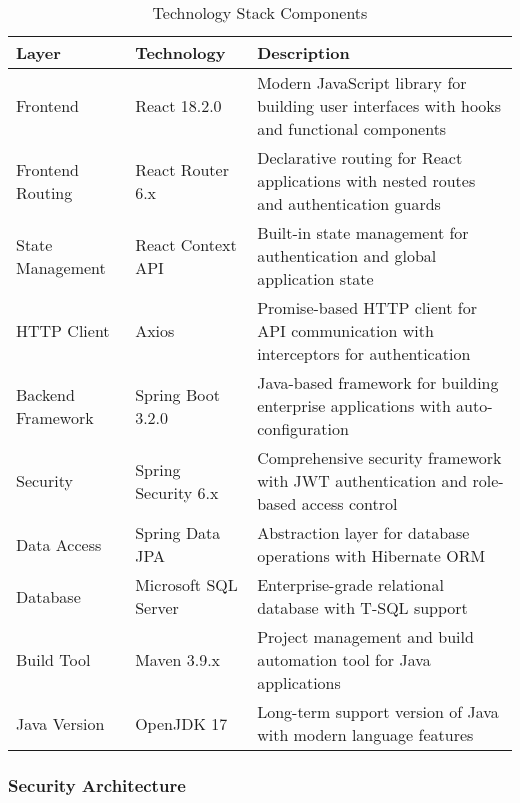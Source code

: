 \documentclass[12pt,a4paper]{article}
\begin{document}
\begin{table}[H]
\centering
\caption{Technology Stack Components}
\label{tab:tech-stack}
\begin{tabularx}{\textwidth}{|l|l|X|}
\hline
\textbf{Layer} & \textbf{Technology} & \textbf{Description} \\
\hline
Frontend & React 18.2.0 & Modern JavaScript library for building user interfaces with hooks and functional components \\
\hline
Frontend Routing & React Router 6.x & Declarative routing for React applications with nested routes and authentication guards \\
\hline
State Management & React Context API & Built-in state management for authentication and global application state \\
\hline
HTTP Client & Axios & Promise-based HTTP client for API communication with interceptors for authentication \\
\hline
Backend Framework & Spring Boot 3.2.0 & Java-based framework for building enterprise applications with auto-configuration \\
\hline
Security & Spring Security 6.x & Comprehensive security framework with JWT authentication and role-based access control \\
\hline
Data Access & Spring Data JPA & Abstraction layer for database operations with Hibernate ORM \\
\hline
Database & Microsoft SQL Server & Enterprise-grade relational database with T-SQL support \\
\hline
Build Tool & Maven 3.9.x & Project management and build automation tool for Java applications \\
\hline
Java Version & OpenJDK 17 & Long-term support version of Java with modern language features \\
\hline
\end{tabularx}
\end{table}

\subsubsection{Security Architecture}
\end{document}
